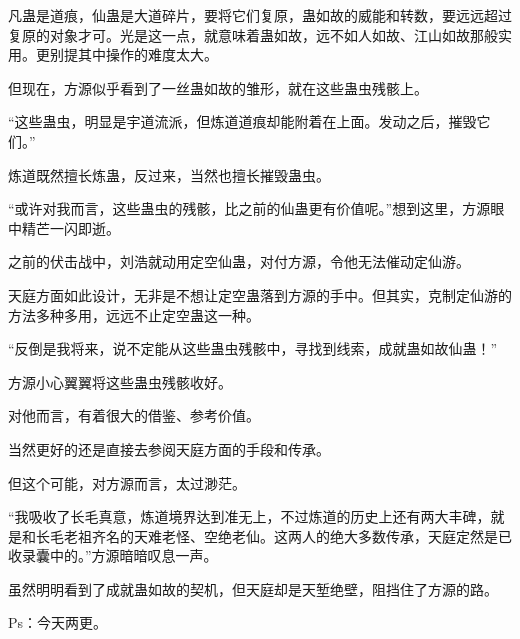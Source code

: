 \begin{this_body}
凡蛊是道痕，仙蛊是大道碎片，要将它们复原，蛊如故的威能和转数，要远远超过复原的对象才可。光是这一点，就意味着蛊如故，远不如人如故、江山如故那般实用。更别提其中操作的难度太大。

但现在，方源似乎看到了一丝蛊如故的雏形，就在这些蛊虫残骸上。

“这些蛊虫，明显是宇道流派，但炼道道痕却能附着在上面。发动之后，摧毁它们。”

炼道既然擅长炼蛊，反过来，当然也擅长摧毁蛊虫。

“或许对我而言，这些蛊虫的残骸，比之前的仙蛊更有价值呢。”想到这里，方源眼中精芒一闪即逝。

之前的伏击战中，刘浩就动用定空仙蛊，对付方源，令他无法催动定仙游。

天庭方面如此设计，无非是不想让定空蛊落到方源的手中。但其实，克制定仙游的方法多种多用，远远不止定空蛊这一种。

“反倒是我将来，说不定能从这些蛊虫残骸中，寻找到线索，成就蛊如故仙蛊！”

方源小心翼翼将这些蛊虫残骸收好。

对他而言，有着很大的借鉴、参考价值。

当然更好的还是直接去参阅天庭方面的手段和传承。

但这个可能，对方源而言，太过渺茫。

“我吸收了长毛真意，炼道境界达到准无上，不过炼道的历史上还有两大丰碑，就是和长毛老祖齐名的天难老怪、空绝老仙。这两人的绝大多数传承，天庭定然是已收录囊中的。”方源暗暗叹息一声。

虽然明明看到了成就蛊如故的契机，但天庭却是天堑绝壁，阻挡住了方源的路。

Ps：今天两更。

\end{this_body}

